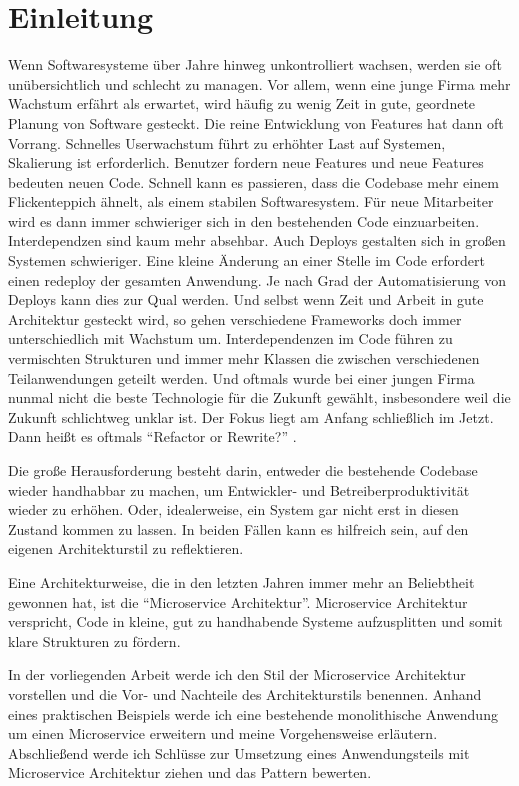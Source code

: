 \chapter{Einleitung}
Wenn Softwaresysteme über Jahre hinweg unkontrolliert wachsen, werden sie oft unübersichtlich und schlecht zu managen. Vor allem, wenn eine junge Firma mehr Wachstum erfährt als erwartet, wird häufig zu wenig Zeit in gute, geordnete Planung von Software gesteckt. Die reine Entwicklung von Features hat dann oft Vorrang. Schnelles Userwachstum führt zu erhöhter Last auf Systemen, Skalierung ist erforderlich. Benutzer fordern neue Features und neue Features bedeuten neuen Code. Schnell kann es passieren, dass die Codebase mehr einem Flickenteppich ähnelt, als einem stabilen Softwaresystem. Für neue Mitarbeiter wird es dann immer schwieriger sich in den bestehenden Code einzuarbeiten. Interdependzen sind kaum mehr absehbar. Auch Deploys gestalten sich in großen Systemen schwieriger. Eine kleine Änderung an einer Stelle im Code erfordert einen redeploy der gesamten Anwendung. Je nach Grad der Automatisierung von Deploys kann dies zur Qual werden. Und selbst wenn Zeit und Arbeit in gute Architektur gesteckt wird, so gehen verschiedene Frameworks doch immer unterschiedlich mit Wachstum um. Interdependenzen im Code führen zu vermischten Strukturen und immer mehr Klassen die zwischen verschiedenen Teilanwendungen geteilt werden. Und oftmals wurde bei einer jungen Firma nunmal nicht die beste Technologie für die Zukunft gewählt, insbesondere weil die Zukunft schlichtweg unklar ist. Der Fokus liegt am Anfang schließlich im Jetzt. Dann heißt es oftmals ``Refactor or Rewrite?'' \cite[vgl.][]{refactorrewrite}.

Die große Herausforderung besteht darin, entweder die bestehende Codebase wieder handhabbar zu machen, um Entwickler- und Betreiberproduktivität wieder zu erhöhen. Oder, idealerweise, ein System gar nicht erst in diesen Zustand kommen zu lassen. In beiden Fällen kann es hilfreich sein, auf den eigenen Architekturstil zu reflektieren.

Eine Architekturweise, die in den letzten Jahren immer mehr an Beliebtheit gewonnen hat, ist die ``Microservice Architektur''. Microservice Architektur verspricht, Code in kleine, gut zu handhabende Systeme aufzusplitten und somit klare Strukturen zu fördern.

In der vorliegenden Arbeit werde ich den Stil der Microservice Architektur vorstellen und die Vor- und Nachteile des Architekturstils benennen. Anhand eines praktischen Beispiels werde ich eine bestehende monolithische Anwendung um einen Microservice erweitern und meine Vorgehensweise erläutern.
Abschließend werde ich Schlüsse zur Umsetzung eines Anwendungsteils mit Microservice Architektur ziehen und das Pattern bewerten.